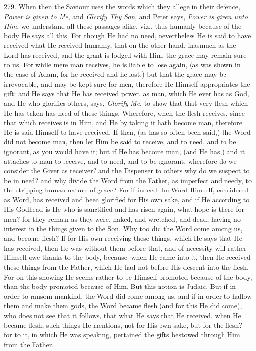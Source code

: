 279.
When then the Saviour uses the words which they allege in their
defence, \emph{Power is given to Me}, and \emph{Glorify Thy Son}, and
Peter says, \emph{Power is given unto Him}, we understand all these
passages alike, viz., thus humanly because of the body He says all
this. For though He had no need, nevertheless He is said to have
received what He received humanly, that on the other hand, inasmuch as
the Lord has received, and the grant is lodged with Him, the grace may
remain sure to us. For while mere man receives, he is liable to lose
again, (as was shown in the case of Adam, for he received and he
lost,) but that the grace may be irrevocable, and may be kept sure for
men, therefore He Himself appropriates the gift; and He says that He
has received power, as man, which He ever has as God, and He who
glorifies others, says, \emph{Glorify Me}, to show that that very
flesh which He has taken has need of these things. Wherefore, when the
flesh receives, since that which receives is in Him, and He by taking
it hath become man, therefore He is said Himself to have received. If
then, (as has so often been said,) the Word did not become man, then
let Him be said to receive, and to need, and to be ignorant, as you
would have it; but if He has become man, (and He has,) and it attaches
to man to receive, and to need, and to be ignorant, wherefore do we
consider the Giver as receiver? and the Dispenser to others why do we
suspect to be in need? and why divide the Word from the Father, as
imperfect and needy, to the stripping human nature of grace? For if
indeed the Word Himself, considered as Word, has received and
been glorified for His own sake, and if He according to His Godhead is
He who is sanctified and has risen again, what hope is there for men?
for they remain as they were, naked, and wretched, and dead, having no
interest in the things given to the Son. Why too did the Word come
among us, and become flesh? If for His own receiving these things,
which He says that He has received, then He was without them before
that, and of necessity will rather Himself owe thanks to the body,
because, when He came into it, then He received these things from the
Father, which He had not before His descent into the flesh. For on
this showing He seems rather to be Himself promoted because of the
body, than the body promoted because of Him. But this notion is
Judaic. But if in order to ransom mankind, the Word did come among us,
and if in order to hallow them and make them gods, the Word became
flesh (and for this He did come), who does not see that it follows,
that what He says that He received, when He became flesh, such things
He mentions, not for His own sake, but for the flesh? for to it, in
which He was speaking, pertained the gifts bestowed through Him from
the Father.

